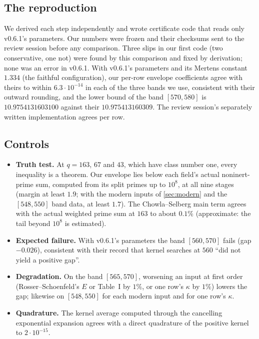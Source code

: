 \documentclass[11pt]{article}
\theoremstyle{definition}
\begin{document}
\subsection{The reproduction}
We derived each step independently and wrote certificate code that reads only v0.6.1's parameters. Our numbers were frozen and their checksums sent to the review session before any comparison. Three slips in our first code (two conservative, one not) were found by this comparison and fixed by derivation; none was an error in v0.6.1. With v0.6.1's parameters and its Mertens constant $1.334$ (the faithful configuration), our per-row envelope coefficients agree with theirs to within $6.3\cdot10^{-14}$ in each of the three bands we use, consistent with their outward rounding, and the lower bound of the band $[570, 580]$ is $10.9754131603100$ against their $10.975413160309$. The review session's separately written implementation agrees per row.

\subsection{Controls}
\begin{itemize}[leftmargin=*]
\item \textbf{Truth test.} At $q = 163$, $67$ and $43$, which have class number one, every inequality is a theorem. Our envelope lies below each field's actual noninert-prime sum, computed from its split primes up to $10^8$, at all nine stages (margin at least $1.9$; with the modern inputs of \cref{sec:modern} and the $[548,550]$ band data, at least $1.7$). The Chowla--Selberg main term agrees with the actual weighted prime sum at $163$ to about $0.1\%$ (approximate: the tail beyond $10^8$ is estimated).
\item \textbf{Expected failure.} With v0.6.1's parameters the band $[560, 570]$ fails (gap $-0.026$), consistent with their record that kernel searches at $560$ ``did not yield a positive gap''.
\item \textbf{Degradation.} On the band $[565, 570]$, worsening an input at first order (Rosser--Schoenfeld's $E$ or Table~I by $1\%$, or one row's $\kappa$ by $1\%$) lowers the gap; likewise on $[548, 550]$ for each modern input and for one row's $\kappa$.
\item \textbf{Quadrature.} The kernel average computed through the cancelling exponential expansion agrees with a direct quadrature of the positive kernel to $2\cdot10^{-15}$.
\end{itemize}
\end{document}
